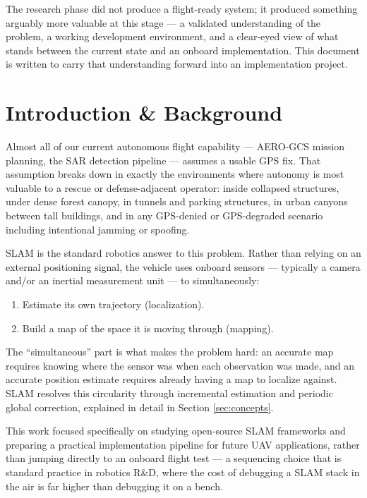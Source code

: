 \documentclass[11pt,a4paper]{article}
\begin{document}
The research phase did not produce a flight-ready system; it produced something arguably more valuable at this stage --- a validated understanding of the problem, a working development environment, and a clear-eyed view of what stands between the current state and an onboard implementation. This document is written to carry that understanding forward into an implementation project.

\section{Introduction \& Background}
Almost all of our current autonomous flight capability --- AERO-GCS mission planning, the SAR detection pipeline --- assumes a usable GPS fix. That assumption breaks down in exactly the environments where autonomy is most valuable to a rescue or defense-adjacent operator: inside collapsed structures, under dense forest canopy, in tunnels and parking structures, in urban canyons between tall buildings, and in any GPS-denied or GPS-degraded scenario including intentional jamming or spoofing.

SLAM is the standard robotics answer to this problem. Rather than relying on an external positioning signal, the vehicle uses onboard sensors --- typically a camera and/or an inertial measurement unit --- to simultaneously:
\begin{enumerate}
    \item Estimate its own trajectory (localization).
    \item Build a map of the space it is moving through (mapping).
\end{enumerate}

The ``simultaneous'' part is what makes the problem hard: an accurate map requires knowing where the sensor was when each observation was made, and an accurate position estimate requires already having a map to localize against. SLAM resolves this circularity through incremental estimation and periodic global correction, explained in detail in Section \ref{sec:concepts}.

This work focused specifically on studying open-source SLAM frameworks and preparing a practical implementation pipeline for future UAV applications, rather than jumping directly to an onboard flight test --- a sequencing choice that is standard practice in robotics R\&D, where the cost of debugging a SLAM stack in the air is far higher than debugging it on a bench.
\end{document}
